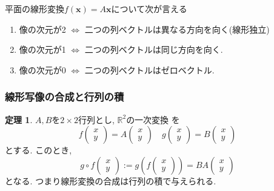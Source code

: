 \documentclass[dvipdfmx,a4paper,11pt]{article}
\newcommand{\R}{\mathbb{R}}
\theoremstyle{definition}
\newtheorem{thm}{定理}
\begin{document}
 平面の線形変換$f(\bm{x})=A\bm{x}$について次が言える
 \begin{enumerate}
     \setlength{\parskip}{0cm} 
  \setlength{\itemsep}{0cm}
 \item 像の次元が2 $  \Leftrightarrow$ 二つの列ベクトルは異なる方向を向く(線形独立)
 \item 像の次元が1 $  \Leftrightarrow$ 二つの列ベクトルは同じ方向を向く.
 \item 像の次元が0 $  \Leftrightarrow$ 二つの列ベクトルはゼロベクトル.
 \end{enumerate}


\subsubsection{線形写像の合成と行列の積}
 
 \begin{tcolorbox}[
    colback = white,
    colframe = green!35!black,
    fonttitle = \bfseries,
    breakable = true]
    \begin{thm}
$A,B$を$2 \times 2$行列とし, $\R^2$の一次変換
を    
  $$
f\begin{pmatrix}
x \\ y
 \end{pmatrix} 
 =
 A
\begin{pmatrix}
x \\ y
 \end{pmatrix}  
\quad
g\begin{pmatrix}
x \\ y
 \end{pmatrix} 
 =
 B
\begin{pmatrix}
x \\ y
 \end{pmatrix}  
$$
 とする. 
 このとき, 
 $$
 g\circ f 
 \begin{pmatrix}
x \\ y
 \end{pmatrix}  
 := g \left( 
 f\begin{pmatrix}
x \\ y
 \end{pmatrix} 
 \right)
 =BA \begin{pmatrix}
x \\ y
 \end{pmatrix} 
 $$
 となる. 
つまり線形変換の合成は行列の積で与えられる. 
\end{thm}
 \end{tcolorbox}
 
\end{document}
